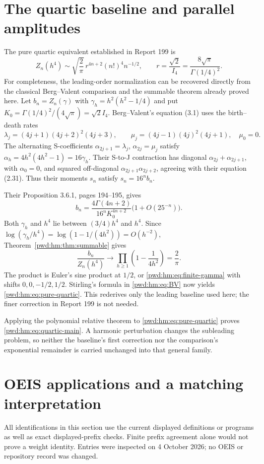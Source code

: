 \documentclass[11pt,letterpaper]{article}
\numberwithin{equation}{section}
\theoremstyle{remark}\newtheorem{remark}[theorem]{Remark}
\begin{document}
\section{The quartic baseline and parallel amplitudes}\label{pwd:hm:sec:quartic}
The pure quartic equivalent established in Report 199 is
\begin{equation}\label{pwd:hm:eq:pure-quartic}
 Z_n(h^4)\sim\sqrt{\frac2\pi}\,r^{4n+2}(n!)^4n^{-1/2},\qquad
 r=\frac{\sqrt2}{I_4}=\frac{8\sqrt\pi}{\Gamma(1/4)^2}.
\end{equation}
For completeness, the leading-order normalization can be recovered directly from the classical Berg--Valent comparison \cite{bergvalent} and the summable theorem already proved here. Let $b_n=Z_n(\gamma)$ with $\gamma_h=h^2(h^2-1/4)$ and put
$K_0=\Gamma(1/4)^2/(4\sqrt\pi)=\sqrt2I_4$. Berg--Valent's equation (3.1) uses the birth--death rates
\[
 \lambda_j=(4j+1)(4j+2)^2(4j+3),\qquad
 \mu_j=(4j-1)(4j)^2(4j+1),\quad\mu_0=0.
\]
The alternating S-coefficients $\alpha_{2j+1}=\lambda_j$, $\alpha_{2j}=\mu_j$ satisfy
$\alpha_h=4h^2(4h^2-1)=16\gamma_h$. Their S-to-J contraction has diagonal $\alpha_{2j}+\alpha_{2j+1}$, with $\alpha_0=0$, and squared off-diagonal $\alpha_{2j+1}\alpha_{2j+2}$, agreeing with their equation (2.31). Thus their moments $s_n$ satisfy $s_n=16^nb_n$.

Their Proposition 3.6.1, pages 194--195, gives
\begin{equation}\label{pwd:hm:eq:BV}
 b_n=\frac{4\Gamma(4n+2)}{16^nK_0^{4n+2}}
 \bigl(1+O(25^{-n})\bigr).
\end{equation}
Both $\gamma_h$ and $h^4$ lie between $(3/4)h^4$ and $h^4$. Since
$\log(\gamma_h/h^4)=\log(1-1/(4h^2))=O(h^{-2})$, Theorem~\ref{pwd:hm:thm:summable} gives
\[
 \frac{b_n}{Z_n(h^4)}\longrightarrow
 \prod_{h\ge1}\left(1-\frac1{4h^2}\right)=\frac2\pi.
\]
The product is Euler's sine product at $1/2$, or \eqref{pwd:hm:eq:finite-gamma} with shifts $0,0,-1/2,1/2$. Stirling's formula in \eqref{pwd:hm:eq:BV} now yields \eqref{pwd:hm:eq:pure-quartic}. This rederives only the leading baseline used here; the finer correction in Report 199 is not needed.

Applying the polynomial relative theorem to \eqref{pwd:hm:eq:pure-quartic} proves \eqref{pwd:hm:eq:quartic-main}. A harmonic perturbation changes the subleading problem, so neither the baseline's first correction nor the comparison's exponential remainder is carried unchanged into that general family.

\section{OEIS applications and a matching interpretation}\label{pwd:hm:sec:applications}
All identifications in this section use the current displayed definitions or programs as well as exact displayed-prefix checks. Finite prefix agreement alone would not prove a weight identity. Entries were inspected on 4 October 2026; no OEIS or repository record was changed.
\end{document}
